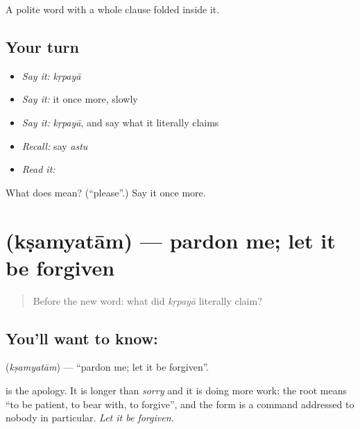 \begin{grammarlens}[title={What you've built}]
A polite word with a whole clause folded inside it.
\end{grammarlens}

\subsection*{Your turn}
\begin{itemize}
\raggedright
  \item \emph{Say it:} \emph{kṛpayā}
  \item \emph{Say it:} it once more, slowly
  \item \emph{Say it:} \emph{kṛpayā}, and say what it literally claims
  \item \emph{Recall:} say \emph{astu}
  \item \emph{Read it:} \textbf{}
\end{itemize}

\begin{tcolorbox}[breakable,colback=teal!4,colframe=teal!35!black,title={Before you move on}]
What does  mean? (\textquotedblleft{}please\textquotedblright{}.) Say it once more.
\end{tcolorbox}
\section[\texorpdfstring{\sk{क्षम्यताम्} (kṣamyatām)}{क्षम्यताम् (kṣamyatām)}]{ (kṣamyatām) — pardon me; let it be forgiven}

\label{lesson:SA-C29-pardon}



\begin{quote}
Before the new word: what did \emph{kṛpayā} literally claim?
\end{quote}

\subsection*{You'll want to know: }
\textbf{} (\emph{kṣamyatām}) — \textquotedblleft{}pardon me; let it be forgiven\textquotedblright{}.

\textbf{} is the apology. It is longer than \emph{sorry} and it is doing more work: the root means \textquotedblleft{}to be patient, to bear with, to forgive\textquotedblright{}, and the form is a command addressed to nobody in particular. \emph{Let it be forgiven.}

